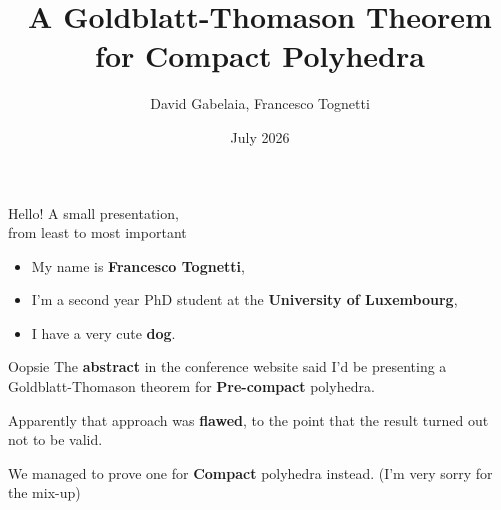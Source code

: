 \documentclass{beamer}
\title{A Goldblatt-Thomason Theorem for Compact Polyhedra}
\subtitle{}
\author{David Gabelaia, Francesco Tognetti}
\date{July 2026}
\institute{TACL @ Krakow}
\begin{document}
\begin{frame}
    \maketitle
\end{frame}
\begin{frame}{Hello!}
    A small presentation, \\
    from least to most important 
    \begin{itemize}
        \item My name is \textbf{Francesco Tognetti},
        \item I'm a second year PhD student 
        at the \textbf{University of Luxembourg},
        \item I have a very cute \textbf{dog}.
    \end{itemize}
\end{frame}
\begin{frame}{Oopsie}
    The \textbf{abstract} in the conference website 
    said I'd be presenting a Goldblatt-Thomason theorem for 
    \textbf{Pre-compact} polyhedra.

    Apparently that approach was \textbf{flawed}, to the point that
    the result turned out not to be valid. 

    We managed to prove one for \textbf{Compact} polyhedra instead.
    \vfill
    (I'm very sorry for the mix-up)
\end{frame}
\end{document}
